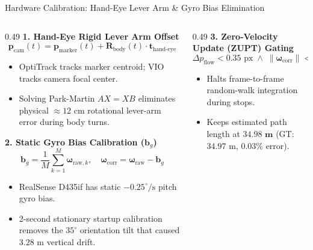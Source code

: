\documentclass[aspectratio=169, 10pt]{beamer}
\begin{document}
\begin{frame}{Hardware Calibration: Hand-Eye Lever Arm \& Gyro Bias Elimination}
  \begin{columns}[T]
    \begin{column}{0.49\textwidth}
      {\small \textbf{\textcolor{NavyBlue}{1. Hand-Eye Rigid Lever Arm Offset}}}
      \begin{equation}
        \mathbf{p}_{\text{cam}}(t) = \mathbf{p}_{\text{marker}}(t) + \mathbf{R}_{\text{body}}(t) \cdot \mathbf{t}_{\text{hand-eye}}
      \end{equation}
      \scriptsize
      \begin{itemize}
        \setlength{\itemsep}{1.5pt}
        \item OptiTrack tracks marker centroid; VIO tracks camera focal center.
        \item Solving Park-Martin $AX=XB$ eliminates physical $\approx 12\text{ cm}$ rotational lever-arm error during body turns.
      \end{itemize}

      \vspace{0.15cm}
      {\small \textbf{\textcolor{NavyBlue}{2. Static Gyro Bias Calibration ($\mathbf{b}_g$)}}}
      \begin{equation}
        \mathbf{b}_g = \frac{1}{M} \sum_{k=1}^M \boldsymbol{\omega}_{\text{raw}, k}, \quad \boldsymbol{\omega}_{\text{corr}} = \boldsymbol{\omega}_{\text{raw}} - \mathbf{b}_g
      \end{equation}
      \scriptsize
      \begin{itemize}
        \setlength{\itemsep}{1.5pt}
        \item RealSense D435if has static $-0.25^\circ/\text{s}$ pitch gyro bias.
        \item 2-second stationary startup calibration removes the $35^\circ$ orientation tilt that caused $3.28\text{ m}$ vertical drift.
      \end{itemize}
    \end{column}

    \begin{column}{0.49\textwidth}
      {\small \textbf{\textcolor{NavyBlue}{3. Zero-Velocity Update (ZUPT) Gating}}}
      \begin{equation}
        \Delta p_{\text{flow}} < 0.35\text{ px} \;\wedge\; \|\boldsymbol{\omega}_{\text{corr}}\| < 0.025\text{ rad/s} \implies \mathbf{t}_{\text{rel}} = \mathbf{0}
      \end{equation}
      \scriptsize
      \begin{itemize}
        \setlength{\itemsep}{1.5pt}
        \item Halts frame-to-frame random-walk integration during stops.
        \item Keeps estimated path length at $\mathbf{34.98\text{ m}}$ (GT: $34.97\text{ m}$, $0.03\%$ error).
      \end{itemize}


\end{column}
\end{columns}
\end{frame}
\end{document}
